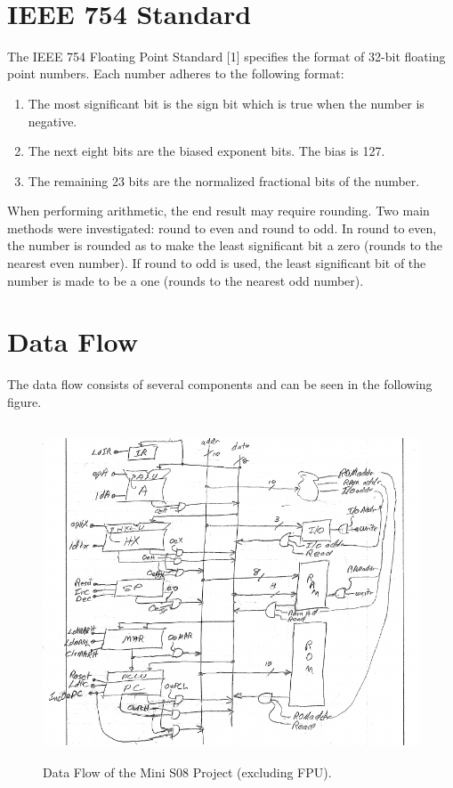 \documentclass[letterpaper, 12pt]{article}
\begin{document}
\begin{flushleft}
~\newline
\section*{IEEE 754 Standard}
The IEEE 754 Floating Point Standard [1] specifies the format of 32-bit floating point numbers.  Each number adheres to the following format:
~\newline
\begin{enumerate}
	\item The most significant bit is the sign bit which is true when the number is negative.
	\item The next eight bits are the biased exponent bits. The bias is 127.
	\item The remaining 23 bits are the normalized fractional bits of the number.
\end{enumerate}

When performing arithmetic, the end result may require rounding.  Two main methods were investigated: round to even and round to odd.  In round to even, the number is rounded as to make the least significant bit a zero (rounds to the nearest even number).  If round to odd is used, the least significant bit of the number is made to be a one (rounds to the nearest odd number).

\newpage
\section*{Data Flow}

The data flow consists of several components and can be seen in the following figure.
 \begin{figure}[H]
 	\centering
 	\includegraphics[width=\linewidth,height=10cm,keepaspectratio]{dataflow.png}
 	\caption[Mini S08 Data Flow]{Data Flow of the Mini S08 Project (excluding FPU).}
 	\label{fig:arch}
 \end{figure}


\end{flushleft}
\end{document}
